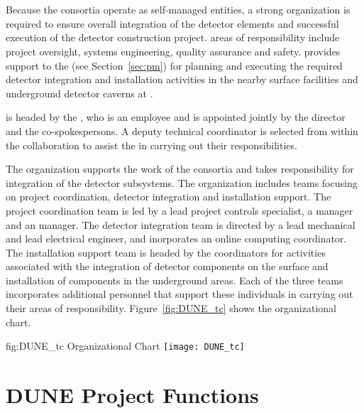 \section{}
\label{sec:tc}

Because the consortia operate as self-managed entities, a strong
 organization is required to ensure overall integration of
the detector elements and successful execution of the detector
construction project.   areas of responsibility include project
oversight, systems engineering, quality assurance and safety.
 provides support to the  (see
Section~\ref{sec:pm}) for planning and executing the required detector
integration and installation activities in the nearby surface
facilities and underground detector caverns at \surf.

 is headed by the , who is an 
employee and is appointed jointly by the  director and the
 co-spokespersons.  A deputy technical coordinator is
selected from within the collaboration to assist the  in
carrying out their responsibilities.

The  organization supports the work of the consortia and
takes responsibility for integration of the detector
subsystems.  The organization includes teams focusing on project
coordination, detector integration and installation support.  The
project coordination team is led by a lead project controls
specialist, a  manager and an  manager.  The
detector integration team is directed by a lead mechanical and lead
electrical engineer, and inorporates an online computing coordinator.
The installation support team is headed by the coordinators for
activities associated with the integration of detector components on
the surface and installation of components in the underground areas.
Each of the three teams incorporates additional personnel that support
these individuals in carrying out their areas of responsibility.
Figure~\ref{fig:DUNE_tc} shows the   organizational chart.
\begin{dunefigure}{fig:DUNE_tc}
  {  Organizational Chart}
  \texttt{[image: DUNE\_tc]}
\end{dunefigure}



\section{DUNE Project Functions}
\label{sec:pm_functions}


